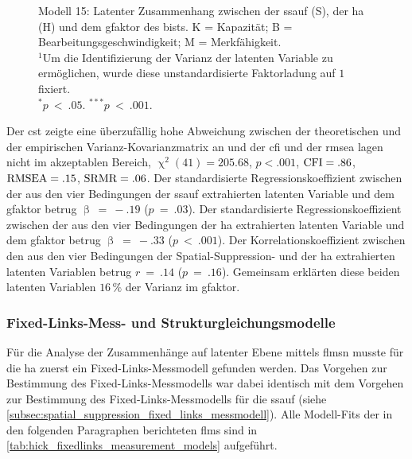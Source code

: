 \documentclass[11pt, twoside, a4paper]{book}		%
\begin{document}
\begin{figure}[b]
\begin{adjustbox}{width=1\textwidth, keepaspectratio}
\begin{tikzpicture}
		\end{tikzpicture}
	\end{adjustbox}
	\vspace{.2cm}
	\caption[Modell 15: Strukturgleichungsmodell zur Vorhersage des \gls{gfaktor}s durch die Spa\-ti\-al-Sup\-pres\-sion- und die \gls{ha}]{Modell 15: Latenter Zusammenhang zwischen der \gls{ssauf} (\textsf{S}), der \gls{ha} (\textsf{H}) und dem \gls{gfaktor} des \gls{bist}s. \textsf{K} = Kapazität; \textsf{B} = Bearbeitungsgeschwindigkeit; \textsf{M} = Merkfähigkeit.\\
		$^1$Um die Identifizierung der Varianz der latenten Variable zu ermöglichen, wurde diese unstandardisierte Faktorladung auf $1$ fixiert.\\
		$^{*}p~<~.05$. $^{***}p~<~.001$.}
	\label{fig:spatial_suppression_hick_g_model}
\end{figure}
Der \gls{cst} zeigte eine überzufällig hohe Abweichung zwischen der theoretischen und der empirischen Var\-ianz-Ko\-var\-ianz\-ma\-trix an und der \gls{cfi} und der \gls{rmsea} lagen nicht im akzeptablen Bereich, $\upchi^2(41)=205.68$, $p<.001$, $\textnormal{CFI}=.86$, $\textnormal{RMSEA}=.15$, $\textnormal{SRMR}=.06$. 
Der standardisierte Regressionskoeffizient zwischen der aus den vier Bedingungen der \gls{ssauf} extrahierten latenten Variable und dem \gls{gfaktor} betrug $\upbeta~=~-.19$ ($p~=~.03$). Der standardisierte Regressionskoeffizient zwischen der aus den vier Bedingungen der \gls{ha} extrahierten latenten Variable und dem \gls{gfaktor} betrug $\upbeta~=~-.33$ ($p~<~.001$). Der Korrelationskoeffizient zwischen den aus den vier Bedingungen der Spatial-Suppression- und der \gls{ha} extrahierten latenten Variablen betrug $r~=~.14$ ($p~=~.16$). Gemeinsam erklärten diese beiden latenten Variablen $16\,\%$ der Varianz im \gls{gfaktor}.

\subsubsection*{Fixed-Links-Mess- und Strukturgleichungsmodelle}

Für die Analyse der Zusammenhänge auf latenter Ebene mittels \glspl{flm}n musste für die \gls{ha} zuerst ein Fixed-Links\--Mess\-modell gefunden werden. Das Vorgehen zur Bestimmung des Fixed-Links-Mess\-mod\-el\-ls war dabei identisch mit dem Vorgehen zur Bestimmung des Fixed-Links-Mess\-mod\-el\-ls für die \gls{ssauf} (siehe \autoref{subsec:spatial_suppression_fixed_links_messmodell}). Alle Modell-Fits der in den folgenden Paragraphen berichteten \glspl{flm} sind in \autoref{tab:hick_fixedlinks_measurement_models} aufgeführt.
\end{document}
